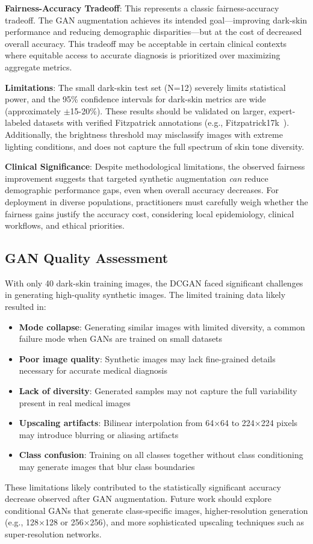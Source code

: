 \documentclass[10pt, twocolumn, letterpaper]{article}
\begin{document}
\textbf{Fairness-Accuracy Tradeoff}: This represents a classic fairness-accuracy tradeoff. The GAN augmentation achieves its intended goal—improving dark-skin performance and reducing demographic disparities—but at the cost of decreased overall accuracy. This tradeoff may be acceptable in certain clinical contexts where equitable access to accurate diagnosis is prioritized over maximizing aggregate metrics.

\textbf{Limitations}: The small dark-skin test set (N=12) severely limits statistical power, and the 95\% confidence intervals for dark-skin metrics are wide (approximately $\pm$15-20\%). These results should be validated on larger, expert-labeled datasets with verified Fitzpatrick annotations (e.g., Fitzpatrick17k~\cite{groh2021}). Additionally, the brightness threshold may misclassify images with extreme lighting conditions, and does not capture the full spectrum of skin tone diversity.

\textbf{Clinical Significance}: Despite methodological limitations, the observed fairness improvement suggests that targeted synthetic augmentation \textit{can} reduce demographic performance gaps, even when overall accuracy decreases. For deployment in diverse populations, practitioners must carefully weigh whether the fairness gains justify the accuracy cost, considering local epidemiology, clinical workflows, and ethical priorities.

\subsection{GAN Quality Assessment}
With only 40 dark-skin training images, the DCGAN faced significant challenges in generating high-quality synthetic images. The limited training data likely resulted in:
\begin{itemize}[leftmargin=*, itemsep=2pt]
    \item \textbf{Mode collapse}: Generating similar images with limited diversity, a common failure mode when GANs are trained on small datasets
    \item \textbf{Poor image quality}: Synthetic images may lack fine-grained details necessary for accurate medical diagnosis
    \item \textbf{Lack of diversity}: Generated samples may not capture the full variability present in real medical images
    \item \textbf{Upscaling artifacts}: Bilinear interpolation from 64×64 to 224×224 pixels may introduce blurring or aliasing artifacts
    \item \textbf{Class confusion}: Training on all classes together without class conditioning may generate images that blur class boundaries
\end{itemize}
These limitations likely contributed to the statistically significant accuracy decrease observed after GAN augmentation. Future work should explore conditional GANs that generate class-specific images, higher-resolution generation (e.g., 128×128 or 256×256), and more sophisticated upscaling techniques such as super-resolution networks.
\end{document}
